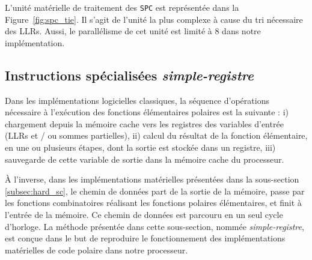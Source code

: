 L'unité matérielle de traitement des \noeuds \texttt{SPC} est représentée dans la Figure~\ref{fig:spc_tie}. Il s'agit de l'unité la plus complexe à cause du tri nécessaire des LLRs. Aussi, le parallélisme de cet unité est limité à 8 dans notre implémentation.

\subsection{Instructions spécialisées \textit{simple-registre}}

Dans les implémentations logicielles classiques, la séquence d'opérations nécessaire à l'exécution des fonctions élémentaires polaires est la suivante : i) chargement depuis la mémoire cache vers les registres des variables d'entrée (LLRs et / ou sommes partielles), ii) calcul du résultat de la fonction élémentaire, en une ou plusieurs étapes, dont la sortie est stockée dans un registre, iii) sauvegarde de cette variable de sortie dans la mémoire cache du processeur.

\`A l'inverse, dans les implémentations matérielles présentées dans la sous-section \ref{subsec:hard_sc}, le chemin de données part de la sortie de la mémoire, passe par les fonctions combinatoires réalisant les fonctions polaires élémentaires, et finit à l'entrée de la mémoire. Ce chemin de données est parcouru en un seul cycle d'horloge. La méthode présentée dans cette sous-section, nommée \textit{simple-registre}, est conçue dans le but de reproduire le fonctionnement des implémentations matérielles de code polaire dans notre processeur.

